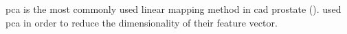 \ac{pca} is the most commonly used linear mapping method in \ac{cad} prostate (\cite{Jolliffe2002}). %
%
%
%
%
%
\cite{Tiwari2008,Tiwari2009,Tiwari2012} used \ac{pca} in order to reduce the dimensionality of their feature vector.

